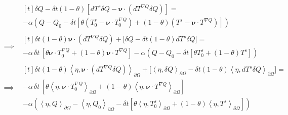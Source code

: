 \documentclass[reqno]{article}
\begin{document}
\begin{equation} \label{eq:surface-weak-form}
\begin{split}
&\begin{multlined}[t]
    \delta Q - \delta t \left(1 - \theta\right) \left[ dT^s \delta Q - \boldsymbol\nu \cdot \left( dT^{\nabla Q} \delta Q \right) \right]
    = \\
    - \alpha \left(
        Q - Q_0 - \delta t \left[
            \theta \left( T_0^s - \boldsymbol\nu \cdot T_0^{\nabla Q} \right)
            + \left(1 - \theta\right) \left( T^s - \boldsymbol\nu \cdot T^{\nabla Q} \right)
        \right]
    \right) 
\end{multlined} \\
\implies
&\begin{multlined}[t]
    \delta t \left(1 - \theta\right) \boldsymbol\nu \cdot \left( dT^{\nabla Q} \delta Q \right)
    + \biggl[ \delta Q - \delta t \left(1 - \theta \right) dT^s \delta Q \biggr]
    = \\
    -\alpha \, \delta t \, \left[ 
        \theta \boldsymbol\nu \cdot T_0^{\nabla Q} + \left(1 - \theta\right) \boldsymbol\nu \cdot T^{\nabla Q} 
    \right]
    -
    \alpha \left(Q - Q_0 - \delta t \left[ \theta T_0^s + \left(1 - \theta\right) T^s \right] \right)
\end{multlined} \\
\implies
&\begin{multlined}[t]
    \delta t \left(1 - \theta\right) \left< \eta, \boldsymbol\nu \cdot \left( dT^{\nabla Q} \delta Q \right) \right>_{\partial \Omega}
    + \biggl[ \left< \eta, \delta Q \right>_{\partial \Omega} - \delta t \left(1 - \theta \right) \left< \eta, dT^s \delta Q \right>_{\partial \Omega} \biggr]
    = \\
    -\alpha \, \delta t \, \left[ 
        \theta \left<\eta, \boldsymbol\nu \cdot T_0^{\nabla Q}\right>_{\partial \Omega} + \left(1 - \theta\right) \left<\eta, \boldsymbol\nu \cdot T^{\nabla Q} \right>_{\partial \Omega}
    \right] \\
    -
    \alpha \left(
        \left<\eta, Q\right>_{\partial \Omega} 
            - \left< \eta, Q_0 \right>_{\partial \Omega} 
            - \delta t \left[ 
                \theta \left<\eta, T_0^s\right>_{\partial \Omega} 
                + \left(1 - \theta\right) \left< \eta, T^s \right>_{\partial \Omega} 
            \right] 
    \right)
\end{multlined}
\end{split}
\end{equation}
\end{document}
